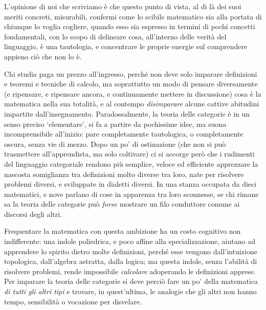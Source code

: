 \begin{itemize}
\end{itemize}
L'opinione di noi che scriviamo è che questo punto di vista, al di là dei suoi meriti concreti, misurabili, confermi come lo scibile matematico sia alla portata di chiunque lo voglia cogliere, quando esso sia espresso in termini di pochi concetti fondamentali, con lo scopo di delineare cosa, all'interno delle verità del linguaggio, è una tautologia, e concentrare le proprie energie sul comprendere appieno ciò che non lo è.

Chi studia paga un prezzo all'ingresso, perché non deve solo imparare definizioni e teoremi e tecniche di calcolo, ma soprattutto un modo di pensare diversamente (e ripensare, e ripensare ancora, e continuamente mettere in discussione) cosa è la matematica nella sua totalità, e al contempo \emph{disimparare} alcune cattive abitudini impartite dall'insegnamento. Paradossalmente, la teoria delle categorie è in un senso preciso `elementare', si fa a partire da pochissime idee, ma suona incomprensibile all'inizio: pare completamente tautologica, o completamente oscura, senza vie di mezzo. Dopo un po' di ostinazione (che non si può trasmettere all'apprendista, ma solo coltivare) ci si accorge però che i rudimenti del linguaggio categoriale rendono più semplice, veloce ed efficiente apprezzare la nascosta somiglianza tra definizioni molto diverse tra loro, nate per risolvere problemi diversi, e sviluppate in dialetti diversi. In una stanza occupata da dieci matematici, e nove parlano di cose in apparenza tra loro sconnesse, se chi rimane sa la teoria delle categorie può \emph{forse} mostrare un filo conduttore comune ai discorsi degli altri.

Frequentare la matematica con questa ambizione ha un costo cognitivo non indifferente: una indole poliedrica, e poco affine alla specializzazione, aiutano ad apprendere lo spirito dietro molte definizioni, perché esse vengono dall'intuizione topologica, dall'algebra astratta, dalla logica; ma questa indole, senza l'abilità di risolvere problemi, rende impossibile \emph{calcolare} adoperando le definizioni apprese. Per imparare la teoria delle categorie si deve perciò fare un po' della matematica \emph{di tutti gli altri tipi} e trovare, in quest'ultima, le analogie che gli altri non hanno tempo, sensibilità o vocazione per disvelare.

